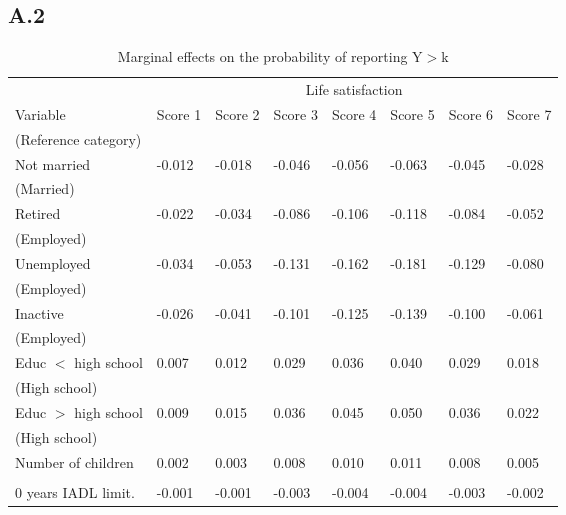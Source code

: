 \documentclass[12pt]{article}
\begin{document}
\clearpage

\subsection*{A.2}

\begin{table}[htbp]
\centering
\footnotesize
\caption{Marginal effects on the probability of reporting Y$>$k}
\label{table1}
\begin{tabular}{l lllllll}
\hline
& \multicolumn{7}{c}{Life satisfaction}\\
Variable & Score 1 & Score 2 & Score 3 & Score 4 & Score 5 & Score 6 & Score 7\\
(Reference category) &\\\hline\hline
Not married                             & -0.012 & -0.018 & -0.046 & -0.056 & -0.063 & -0.045 & -0.028 \\
(Married)                               &&&&&&& \\
\rule{0pt}{3ex}Retired                  & -0.022 & -0.034 & -0.086 & -0.106 & -0.118 & -0.084 & -0.052 \\
(Employed)                              &&&&&&& \\
\rule{0pt}{3ex}Unemployed               & -0.034 & -0.053 & -0.131 & -0.162 & -0.181 & -0.129 & -0.080 \\
(Employed)                              &&&&&&& \\
\rule{0pt}{3ex}Inactive                 & -0.026 & -0.041 & -0.101 & -0.125 & -0.139 & -0.100 & -0.061 \\
(Employed)                              &&&&&&& \\
\rule{0pt}{3ex}Educ $<$ high school     &  0.007 &  0.012 &  0.029 &  0.036 &  0.040 &  0.029 &  0.018 \\
(High school)                           &&&&&&& \\
\rule{0pt}{3ex}Educ $>$ high school     &  0.009 &  0.015 &  0.036 &  0.045 &  0.050 &  0.036 &  0.022 \\
(High school)                           &&&&&&& \\
\rule{0pt}{3ex}Number of children       &  0.002 &  0.003 &  0.008 &  0.010 &  0.011 &  0.008 &  0.005 \\
                                        &&&&&&& \\
\rule{0pt}{3ex}0 years IADL limit.      & -0.001 & -0.001 & -0.003 & -0.004 & -0.004 & -0.003 & -0.002 \\

\end{tabular}
\end{table}
\end{document}
